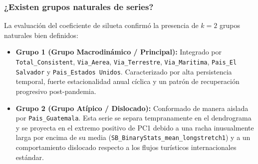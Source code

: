 \documentclass[11pt, a4paper]{article}
\begin{document}
\subsubsection{¿Existen grupos naturales de series?}
La evaluación del coeficiente de silueta confirmó la presencia de $k = 2$ grupos naturales bien definidos:
\begin{itemize}
    \item \textbf{Grupo 1 (Grupo Macrodinámico / Principal):} Integrado por \texttt{Total\_Consistent}, \texttt{Via\_Aerea}, \texttt{Via\_Terrestre}, \texttt{Via\_Maritima}, \texttt{Pais\_El Salvador} y \texttt{Pais\_Estados Unidos}. Caracterizado por alta persistencia temporal, fuerte estacionalidad anual cíclica y un patrón de recuperación progresivo post-pandemia.
    \item \textbf{Grupo 2 (Grupo Atípico / Dislocado):} Conformado de manera aislada por \texttt{Pais\_Guatemala}. Esta serie se separa tempranamente en el dendrograma y se proyecta en el extremo positivo de PC1 debido a una racha inusualmente larga por encima de su media (\texttt{SB\_BinaryStats\_mean\_longstretch1}) y a un comportamiento dislocado respecto a los flujos turísticos internacionales estándar.
\end{itemize}
\end{document}
